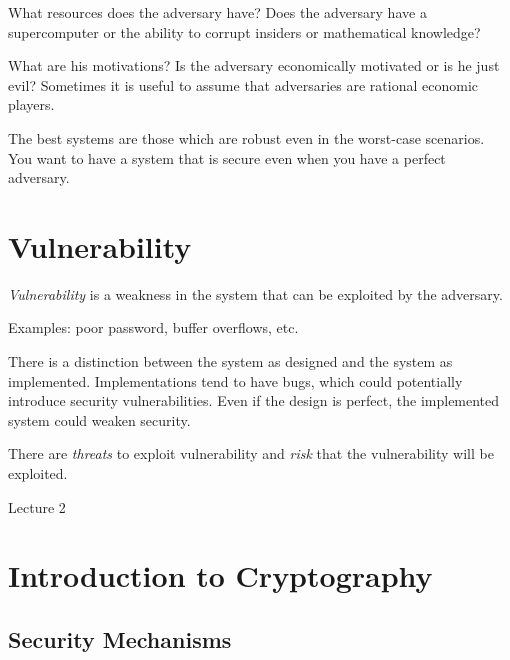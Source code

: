 \documentclass[psamsfonts]{amsart}
\begin{document}
What resources does the adversary have? Does the adversary have a supercomputer or the ability to corrupt insiders or mathematical knowledge?

What are his motivations? Is the adversary economically motivated or is he just evil? Sometimes it is useful to assume that adversaries are rational economic players.

The best systems are those which are robust even in the worst-case scenarios. You want to have a system that is secure even when you have a perfect adversary.

\section{Vulnerability}

\begin{def}
\emph{Vulnerability} is a weakness in the system that can be exploited by the adversary.
\end{def}

Examples: poor password, buffer overflows, etc.

There is a distinction between the system as designed and the system as implemented. Implementations tend to have bugs, which could potentially introduce security vulnerabilities. Even if the design is perfect, the implemented system could weaken security.

There are \emph{threats} to exploit vulnerability and \emph{risk} that the vulnerability will be exploited.


\newpage
\Large{Lecture 2}


\maketitle

\section{Introduction to Cryptography}

\subsection{Security Mechanisms}
\end{document}
